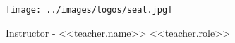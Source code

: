 \documentclass[a4paper,10pt]{article}
\begin{document}
\begin{multicols}{3}
 \begin{minipage}[b][4cm][b]{0.4\textwidth}
   
  
 \end{minipage}%
 \columnbreak
 \begin{minipage}[b][4cm][b]{0.2\textwidth}
 \texttt{[image: ../images/logos/seal.jpg]}
 \end{minipage}%
 \columnbreak
 \begin{flushright}
 \raggedleft
 \begin{minipage}[b][4cm][b]{0.4\textwidth}
     Instructor - <<teacher.name>>\newline
     \footnotesize{<<teacher.role>>}
   \phantom{H}
 \end{minipage}
 \end{flushright}

\end{multicols}
\end{document}

